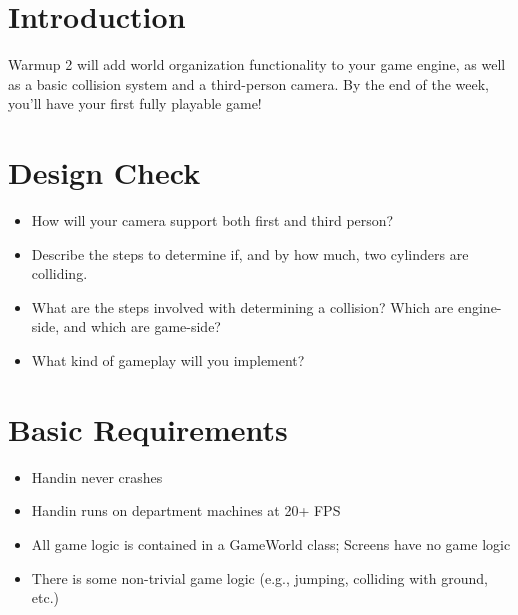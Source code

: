 \documentclass{../cs195u}
\begin{document}
 \section*{Introduction}
Warmup 2 will add world organization functionality to your game engine, as well as a basic collision system and a third-person camera. By the end of the week, you'll have your first fully playable game!

  \section*{Design Check}
  \begin{itemize}
   \item How will your camera support both first and third person?
   \item Describe the steps to determine if, and by how much, two cylinders are colliding.
   \item What are the steps involved with determining a collision? Which are engine-side, and which are game-side?
   \item What kind of gameplay will you implement?
  \end{itemize}

\section*{Basic Requirements}
 \begin{itemize}
\item Handin never crashes
\item Handin runs on department machines at 20+ FPS
\item All game logic is contained in a GameWorld class; Screens have no game logic
\item There is some non-trivial game logic (e.g., jumping, colliding with ground, etc.)
 \end{itemize}
  
\end{document}
